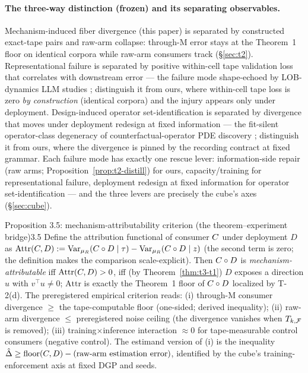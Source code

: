 
\paragraph{The three-way distinction (frozen) and its separating
observables.} Mechanism-induced fiber divergence (this paper) is separated
by constructed exact-tape pairs and raw-arm collapse: through-M error stays
at the Theorem~1 floor on identical corpora while raw-arm consumers track
(\S\ref{sec:t2}). Representational failure is separated by positive
within-cell tape validation loss that correlates with downstream error ---
the failure mode shape-echoed by LOB-dynamics LLM studies \citep{dolob2026};
distinguish it from ours, where within-cell tape loss is zero \emph{by
construction} (identical corpora) and the injury appears only under
deployment. Design-induced operator set-identification is separated by
divergence that moves under deployment redesign at fixed information ---
the fit-silent operator-class degeneracy of counterfactual-operator PDE
discovery \citep{counterfactualoperator2025}; distinguish it from ours,
where the divergence is pinned by the recording contract at fixed grammar.
Each failure mode has exactly one rescue lever: information-side repair
(raw arms; Proposition~\ref{prop:t2-distill}) for ours, capacity/training
for representational failure, deployment redesign at fixed information for
operator set-identification --- and the three levers are precisely the
cube's axes (\S\ref{sec:cube}).

\begin{preregthm}{Proposition 3.5: mechanism-attributability criterion (the
theorem--experiment bridge)}{3.5}
\label{prop:t3-attr}
Define the attribution functional of consumer $C$ under deployment $D$
as $\mathrm{Attr}(C, D) := \mathrm{Var}_{\mu_{R}}(C \circ D \mid \tau) -
\mathrm{Var}_{\mu_{R}}(C \circ D \mid z)$ (the second term is zero; the
definition makes the comparison scale-explicit). Then $C \circ D$ is
\emph{mechanism-attributable} iff $\mathrm{Attr}(C, D) > 0$, iff (by
Theorem~\ref{thm:t3-t1}) $D$ exposes a direction $u$ with $v^{\top}u \ne 0$;
$\mathrm{Attr}$ is exactly the Theorem~1 floor of $C \circ D$ localized by
T-2(d). The preregistered empirical criterion reads: (i) through-M consumer
divergence $\ge$ the tape-computable floor (one-sided; derived inequality);
(ii) raw-arm divergence $\le$ preregistered noise ceiling (the divergence
vanishes when $T_{k,\mathcal{F}}$ is removed); (iii) training$\times$inference
interaction $\approx 0$ for tape-measurable control consumers (negative
control). The estimand version of (i) is the inequality
$\hat{\Delta} \ge \mathrm{floor}(C, D) - (\text{raw-arm estimation
error})$, identified by the cube's training-enforcement axis at fixed DGP
and seeds.
\end{preregthm}


